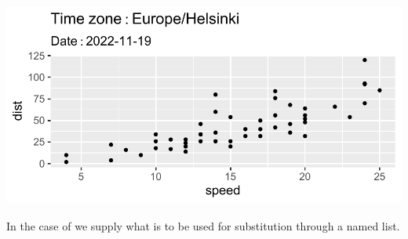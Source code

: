 \documentclass[krantz2]{krantz}\usepackage{knitr}
\begin{document}
\begin{knitrout}\footnotesize
{}\color{fgcolor}\begin{kframe}
\begin{alltt}
  \hlopt{+}
  \hlstd{()} \hlopt{+}
  \hlstd{(} \hlstd{=} \hlopt{~}\hlopt{:} \hlstd{(}\hlstd{())),}
        \hlstd{=} \hlopt{:} \hlstd{(}\hlstd{(}\hlstd{())))}
       \hlstd{)}
\end{alltt}
\end{kframe}

{\centering \includegraphics[width=.7\textwidth]{figure/pos-expr-bquote-01-1} 

}



\end{knitrout}

In the case of  we supply what is to be used for substitution through a named list.
\end{document}
